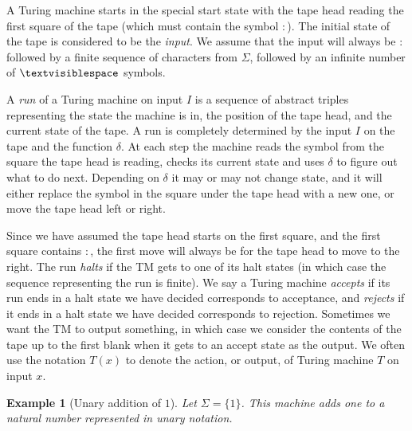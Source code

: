 \documentclass{article}
\theoremstyle{plain}
\newtheorem{example}[theorem]{Example}{\bfseries}{\upshape}
\newcommand{\tvs}{\textvisiblespace}
\begin{document}
A Turing machine starts in the special start state with the tape head reading the first square of the tape (which must contain the symbol $:$). The initial state of the tape is considered to be the \emph{input}. We assume that the input will always be $:$ followed by a finite sequence of characters from $\Sigma$, followed by an infinite number of $\tvs$ symbols.   
 
A \emph{run} of a Turing machine on input $I$ is a sequence of abstract triples representing the state the machine is in, the position of the tape head, and the current state of the tape. A run is completely determined by the input $I$ on the tape and the function $\delta$. At each step the machine reads the symbol from the square the tape head is reading, checks its current state and uses $\delta$ to figure out what to do next. Depending on $\delta$ it may or may not change state, and it will either replace the symbol in the square under the tape head with a new one, or move the tape head left or right. 

Since we have assumed the tape head starts on the first square, and the first square contains $:$, the first move will always be for the tape head to move to the right. The run \emph{halts} if the TM gets to one of its halt states (in which case the sequence representing the run is finite).  We say a Turing machine \emph{accepts} if its run ends in a halt state we have decided corresponds to acceptance, and \emph{rejects} if it ends in a halt state we have decided corresponds to rejection. Sometimes we want the TM to output something, in which case we consider the contents of the tape up to the first blank when it gets to an accept state as the output. We often use the notation $T(x)$ to denote the action, or output, of Turing machine $T$ on input $x$.


\begin{example}[Unary addition of $1$]
Let $\Sigma=\{1\}$. This machine adds one to a natural number represented in unary notation.
\begin{center}
\end{center}
\end{example}
\end{document}
